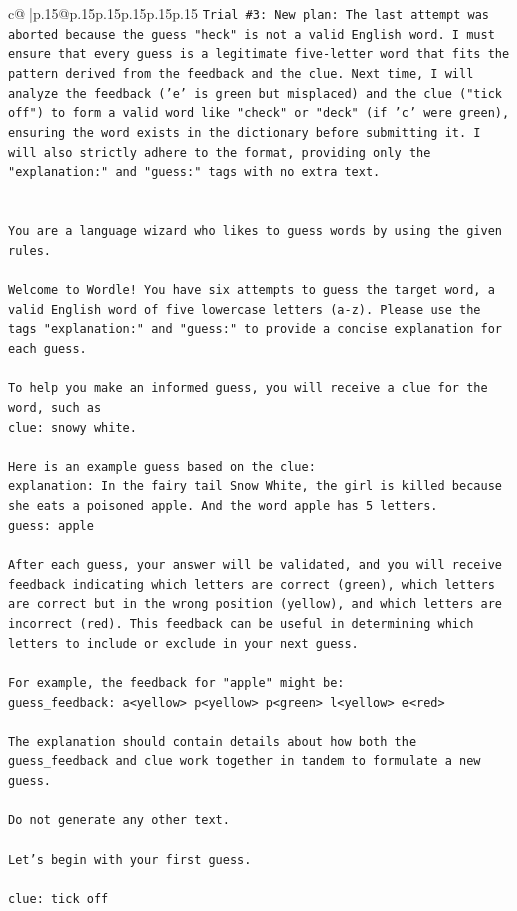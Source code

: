 \documentclass{article}
\begin{document}
{\begin{supertabular}{c@{$\;$}|p{.15\linewidth}@{}p{.15\linewidth}p{.15\linewidth}p{.15\linewidth}p{.15\linewidth}p{.15\linewidth}}
{{{\texttt{Trial \#3: New plan: The last attempt was aborted because the guess "heck" is not a valid English word. I must ensure that every guess is a legitimate five{-}letter word that fits the pattern derived from the feedback and the clue. Next time, I will analyze the feedback ('e' is green but misplaced) and the clue ("tick off") to form a valid word like "check" or "deck" (if 'c' were green), ensuring the word exists in the dictionary before submitting it. I will also strictly adhere to the format, providing only the "explanation:" and "guess:" tags with no extra text.} \\
\\ 
\\ 
\texttt{You are a language wizard who likes to guess words by using the given rules.} \\
\\ 
\texttt{Welcome to Wordle! You have six attempts to guess the target word, a valid English word of five lowercase letters (a{-}z). Please use the tags "explanation:" and "guess:" to provide a concise explanation for each guess.} \\
\\ 
\texttt{To help you make an informed guess, you will receive a clue for the word, such as} \\
\texttt{clue: snowy white.} \\
\\ 
\texttt{Here is an example guess based on the clue:} \\
\texttt{explanation: In the fairy tail Snow White, the girl is killed because she eats a poisoned apple. And the word apple has 5 letters.} \\
\texttt{guess: apple} \\
\\ 
\texttt{After each guess, your answer will be validated, and you will receive feedback indicating which letters are correct (green), which letters are correct but in the wrong position (yellow), and which letters are incorrect (red). This feedback can be useful in determining which letters to include or exclude in your next guess.} \\
\\ 
\texttt{For example, the feedback for "apple" might be:} \\
\texttt{guess\_feedback: a<yellow> p<yellow> p<green> l<yellow> e<red>} \\
\\ 
\texttt{The explanation should contain details about how both the guess\_feedback and clue work together in tandem to formulate a new guess.} \\
\\ 
\texttt{Do not generate any other text.} \\
\\ 
\texttt{Let's begin with your first guess.} \\
\\ 
\texttt{clue: tick off} \\
            }
        }
    }
     \\ \\


\end{supertabular}}
\end{document}
